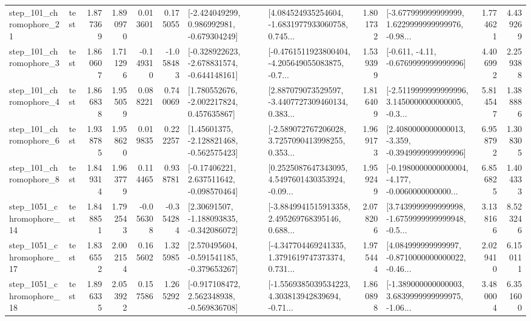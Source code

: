 \begin{tabular}{llrrrrllrlrr}
  step\_101\_chromophore\_21 &      test &      1.877369 &    1.890970 &      0.013601 &  0.175055 &   [-2.424049299, 0.986992981, -0.679304249] &  [4.084524935254604, -1.6831977933060758, 0.745... &       1.801732 &  [-3.677999999999999, 1.6229999999999976, -0.98... &            1.774621 &          4.439269 \\
   step\_101\_chromophore\_3 &      test &      1.860607 &    1.711296 &     -0.149310 & -1.058483 &  [-0.328922623, -2.678831574, -0.644148161] &  [-0.4761511923800404, -4.205649055083875, -0.7... &       1.539399 &               [-0.611, -4.11, -0.6769999999999996] &            4.406992 &          2.259388 \\
   step\_101\_chromophore\_4 &      test &      1.866838 &    1.955059 &      0.088221 &  0.740069 &    [1.780552676, -2.002217824, 0.457635867] &  [2.887079073529597, -3.4407727309460134, 0.383... &       1.816409 &  [-2.5119999999999996, 3.1450000000000005, -0.3... &            5.814547 &          1.388886 \\
   step\_101\_chromophore\_6 &      test &      1.938785 &    1.958620 &      0.019835 &  0.222257 &    [1.45601375, -2.128821468, -0.562575423] &  [-2.589072767206028, 3.7257090413998255, 0.353... &       1.969173 &  [2.4080000000000013, -3.359, -0.3949999999999996] &            6.958792 &          1.308305 \\
   step\_101\_chromophore\_8 &      test &      1.849314 &    1.963779 &      0.114465 &  0.938781 &    [-0.17406221, 2.637511642, -0.098570464] &  [0.2525087647343095, 4.5497601430353924, -0.09... &       1.959249 &  [-0.1980000000000004, -4.177, -0.0060000000000... &            6.856825 &          1.404333 \\
 step\_1051\_chromophore\_14 &      test &      1.848851 &    1.792543 &     -0.056308 & -0.354284 &    [2.30691507, -1.188093835, -0.342086072] &  [-3.8849941515913358, 2.495269768395146, 0.688... &       2.078206 &  [3.7439999999999998, -1.6759999999999948, -0.5... &            3.138166 &          8.523246 \\
 step\_1051\_chromophore\_17 &      test &      1.836552 &    2.002154 &      0.165602 &  1.325985 &   [2.570495604, -0.591541185, -0.379653267] &  [-4.347704469241335, 1.3791619747373374, 0.731... &       1.975444 &  [4.084999999999997, -0.8710000000000022, -0.46... &            2.029410 &          6.150111 \\
 step\_1051\_chromophore\_18 &      test &      1.896335 &    2.053922 &      0.157586 &  1.265292 &   [-0.917108472, 2.562348938, -0.569836708] &  [-1.5569385039534223, 4.303813942839694, -0.71... &       1.860898 &  [-1.389000000000003, 3.6839999999999975, -1.06... &            3.480004 &          6.351600 \\

\end{tabular}
